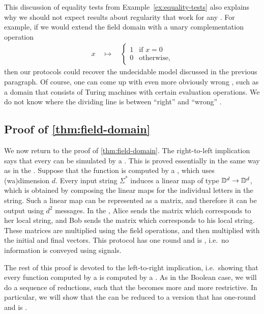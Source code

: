 \begin{myexample}\label{ex:wrong-output-domains}
 This discussion of equality tests from Example~\ref{ex:equality-tests} also
 explains why we should not expect results about regularity that work for any
 . For example, if we would extend the field domain with a unary
 complementation operation 
 \begin{align*}
 x 
 \quad \mapsto \quad 
 \begin{cases}
    1 & \text{if $x =0$}\\
    0 & \text{otherwise},
\end{cases}
 \end{align*}
 then our protocols could recover the undecidable model discussed in the
 previous paragraph.  Of course, one can come up with even more obviously wrong
 , such as a domain that consists of Turing machines with certain
 evaluation operations. We do not know where the dividing line is between
 ``right'' and ``wrong'' .
\end{myexample}


\subsection{Proof of \cref{thm:field-domain}}
\label{sec:proof-of-thm-field-domain}
\AP
We now return to the proof of \cref{thm:field-domain}. The right-to-left
implication says that every  can be simulated by a .
This is proved essentially in the same way as in the . 
Suppose that
the function is computed by a , which uses \kl(wa){dimension} $d$.
Every input string $\Sigma^*$ induces a linear map of type $\mathbb D^d \to
\mathbb D^d$, which is obtained by composing the linear maps for the individual
letters in the string.  Such a linear map can be represented as a matrix, and
therefore it can be output using $d^2$ messages.  In the , Alice sends
the matrix  which corresponds to her local string, and Bob sends the  matrix
which corresponds to  his local string. These matrices are multiplied using the
field operations, and then multiplied with the initial and final vectors. This
protocol has one round and is , i.e.~no information is conveyed
using signals.

The rest of this proof is devoted to the left-to-right implication,
i.e.~showing that every function computed by a  is computed by a
. As in the Boolean case, we will do a sequence of
reductions, such that the  becomes more and more restrictive. In
particular, we will show that the  can be reduced to a version that has
one-round and is .

